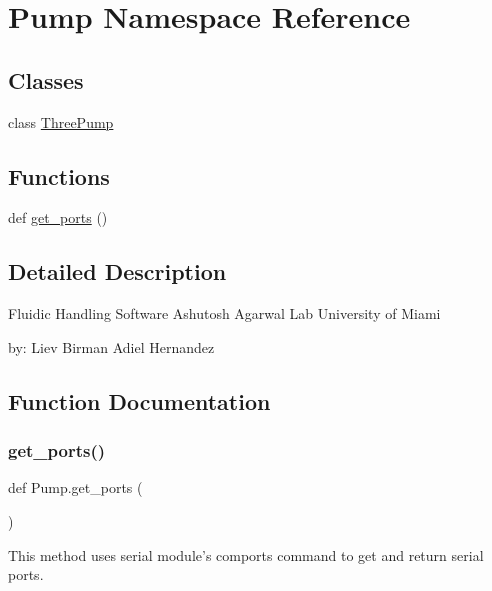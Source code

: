\hypertarget{namespace_pump}{}\section{Pump Namespace Reference}
\label{namespace_pump}
\subsection*{Classes}
\begin{DoxyCompactItemize}
\item 
class \mbox{\hyperlink{class_pump_1_1_three_pump}{Three\+Pump}}
\end{DoxyCompactItemize}
\subsection*{Functions}
\begin{DoxyCompactItemize}
\item 
def \mbox{\hyperlink{namespace_pump_aff7d4116a67559ba3db8143f12fb4da6}{get\+\_\+ports}} ()
\end{DoxyCompactItemize}


\subsection{Detailed Description}
\begin{DoxyVerb}Fluidic Handling Software
Ashutosh Agarwal Lab
University of Miami

by:
Liev Birman
Adiel Hernandez
\end{DoxyVerb}
 

\subsection{Function Documentation}
\mbox{\label{namespace_pump_aff7d4116a67559ba3db8143f12fb4da6}} 
\subsubsection{\texorpdfstring{get\_ports()}{get\_ports()}}
{\footnotesize\ttfamily def Pump.\+get\+\_\+ports (\begin{DoxyParamCaption}{ }\end{DoxyParamCaption})}

\begin{DoxyVerb}This method uses serial module's comports command to get and return serial ports.
\end{DoxyVerb}
 